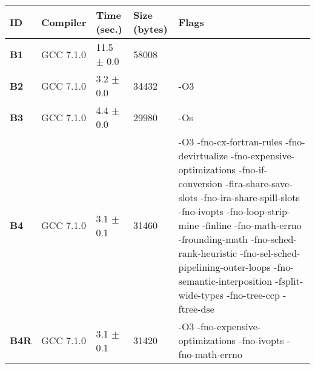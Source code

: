     \begin{tabular}{|l|l|l|l|p{3.2in}|}
     \hline
      \textbf{ID} & \textbf{Compiler} & \textbf{Time (sec.)} & \textbf{Size (bytes)} & \textbf{Flags} \\ 
     \hline
      \textbf{ B1 } &  GCC 7.1.0  &  11.5 $\pm$ 0.0  &  58008  & {\small  }\\
     \hline
      \textbf{ B2 } &  GCC 7.1.0  &  3.2 $\pm$ 0.0  &  34432  & {\small -O3 }\\
     \hline
      \textbf{ B3 } &  GCC 7.1.0  &  4.4 $\pm$ 0.0  &  29980  & {\small -Os }\\
     \hline
      \textbf{ B4 } &  GCC 7.1.0  &  3.1 $\pm$ 0.1  &  31460  & {\small -O3 -fno-cx-fortran-rules -fno-devirtualize -fno-expensive-optimizations -fno-if-conversion -fira-share-save-slots -fno-ira-share-spill-slots -fno-ivopts -fno-loop-strip-mine -finline -fno-math-errno -frounding-math -fno-sched-rank-heuristic -fno-sel-sched-pipelining-outer-loops -fno-semantic-interposition -fsplit-wide-types -fno-tree-ccp -ftree-dse }\\
     \hline
      \textbf{ B4R } &  GCC 7.1.0  &  3.1 $\pm$ 0.1  &  31420  & {\small -O3 -fno-expensive-optimizations -fno-ivopts -fno-math-errno }\\
     \hline
    \end{tabular}    